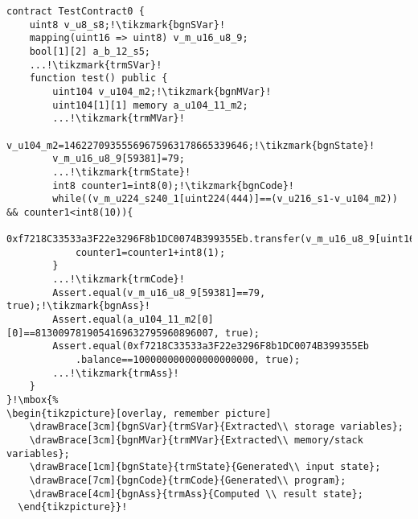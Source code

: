 \begin{lstlisting}[style=solidity_style, escapechar=!, basicstyle=\tiny, mathescape]
contract TestContract0 {
    uint8 v_u8_s8;!\tikzmark{bgnSVar}!
    mapping(uint16 => uint8) v_m_u16_u8_9;
    bool[1][2] a_b_12_s5;
    ...!\tikzmark{trmSVar}!
    function test() public {
        uint104 v_u104_m2;!\tikzmark{bgnMVar}!
        uint104[1][1] memory a_u104_11_m2;
        ...!\tikzmark{trmMVar}!
        v_u104_m2=14622709355569675963178665339646;!\tikzmark{bgnState}!
        v_m_u16_u8_9[59381]=79;
        ...!\tikzmark{trmState}!
        int8 counter1=int8(0);!\tikzmark{bgnCode}!
        while((v_m_u224_s240_1[uint224(444)]==(v_u216_s1-v_u104_m2)) && counter1<int8(10)){
            0xf7218C33533a3F22e3296F8b1DC0074B399355Eb.transfer(v_m_u16_u8_9[uint16(0)]);
            counter1=counter1+int8(1);
        }
        ...!\tikzmark{trmCode}!
        Assert.equal(v_m_u16_u8_9[59381]==79, true);!\tikzmark{bgnAss}!
        Assert.equal(a_u104_11_m2[0][0]==8130097819054169632795960896007, true);
        Assert.equal(0xf7218C33533a3F22e3296F8b1DC0074B399355Eb
            .balance==100000000000000000000, true);
        ...!\tikzmark{trmAss}!
    }
}!\mbox{%
\begin{tikzpicture}[overlay, remember picture]
    \drawBrace[3cm]{bgnSVar}{trmSVar}{Extracted\\ storage variables};
    \drawBrace[3cm]{bgnMVar}{trmMVar}{Extracted\\ memory/stack variables};
    \drawBrace[1cm]{bgnState}{trmState}{Generated\\ input state};
    \drawBrace[7cm]{bgnCode}{trmCode}{Generated\\ program};
    \drawBrace[4cm]{bgnAss}{trmAss}{Computed \\ result state};
  \end{tikzpicture}}!
\end{lstlisting}
  
